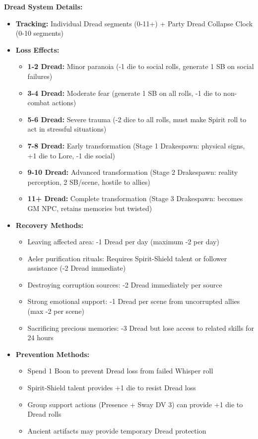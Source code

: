 \documentclass[11pt]{article}
\begin{document}
\textbf{Dread System Details:}
\begin{itemize}
\item \textbf{Tracking:} Individual Dread segments (0-11+) + Party Dread Collapse Clock (0-10 segments)
\item \textbf{Loss Effects:}
  \begin{itemize}
  \item \textbf{1-2 Dread:} Minor paranoia (-1 die to social rolls, generate 1 SB on social failures)
  \item \textbf{3-4 Dread:} Moderate fear (generate 1 SB on all rolls, -1 die to non-combat actions)
  \item \textbf{5-6 Dread:} Severe trauma (-2 dice to all rolls, must make Spirit roll to act in stressful situations)
  \item \textbf{7-8 Dread:} Early transformation (Stage 1 Drakespawn: physical signs, +1 die to Lore, -1 die social)
  \item \textbf{9-10 Dread:} Advanced transformation (Stage 2 Drakespawn: reality perception, 2 SB/scene, hostile to allies)
  \item \textbf{11+ Dread:} Complete transformation (Stage 3 Drakespawn: becomes GM NPC, retains memories but twisted)
  \end{itemize}
\item \textbf{Recovery Methods:}
  \begin{itemize}
  \item Leaving affected area: -1 Dread per day (maximum -2 per day)
  \item Aeler purification rituals: Requires Spirit-Shield talent or follower assistance (-2 Dread immediate)
  \item Destroying corruption sources: -2 Dread immediately per source
  \item Strong emotional support: -1 Dread per scene from uncorrupted allies (max -2 per scene)
  \item Sacrificing precious memories: -3 Dread but lose access to related skills for 24 hours
  \end{itemize}
\item \textbf{Prevention Methods:}
  \begin{itemize}
  \item Spend 1 Boon to prevent Dread loss from failed Whisper roll
  \item Spirit-Shield talent provides +1 die to resist Dread loss
  \item Group support actions (Presence + Sway DV 3) can provide +1 die to Dread rolls
  \item Ancient artifacts may provide temporary Dread protection
  \end{itemize}
\end{itemize}
\end{document}
